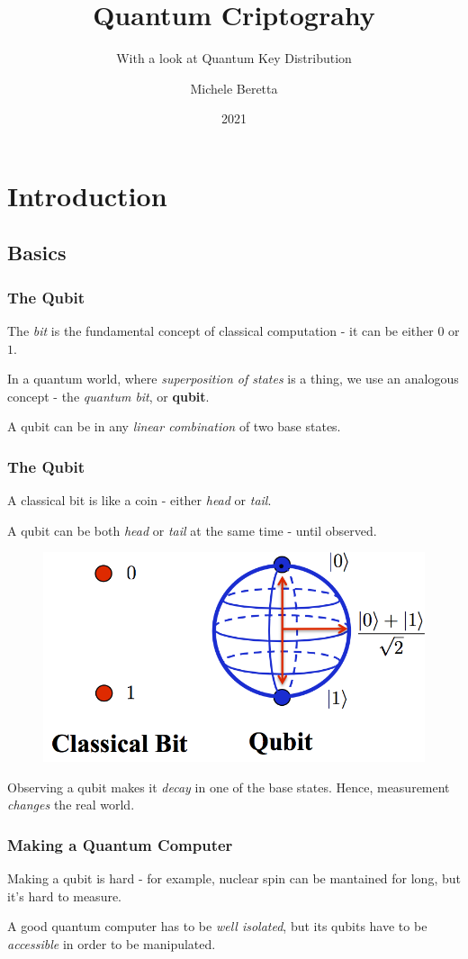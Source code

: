 \documentclass{beamer}
\title{Quantum Criptograhy}
\subtitle{With a look at Quantum Key Distribution}
\author{Michele Beretta}
\institute{UniBG
  \\ \url{https://github.com/micheleberetta98/qkd-presentation}
}
\date{2021}
\begin{document}
  \begin{frame}[plain]
    \titlepage
  \end{frame}


  \section{Introduction}
  \subsection{Basics}
  \begin{frame}
    \frametitle{The Qubit}
    The \textit{bit} is the fundamental concept of classical computation - it can be either $0$ or $1$.

    In a quantum world, where \textit{superposition of states} is a thing, we use an analogous concept -
    the \textit{quantum bit}, or \textbf{qubit}.

    A qubit can be in any \textit{linear combination} of two base states.
  \end{frame}
  \begin{frame}
    \frametitle{The Qubit}
    A classical bit is like a coin - either \textit{head} or \textit{tail}.

    A qubit can be both \textit{head} or \textit{tail} at the same time - until observed.

    \begin{figure}[H]
      \centering
      \includegraphics[width=0.5\linewidth]{qubit.png}
    \end{figure}

    Observing a qubit makes it \textit{decay} in one of the base states. Hence, measurement
    \textit{changes} the real world.
  \end{frame}
  \begin{frame}
    \frametitle{Making a Quantum Computer}
    Making a qubit is hard - for example, nuclear spin can be mantained for long, but it's hard to measure.

    A good quantum computer has to be \textit{well isolated}, but its qubits have to be \textit{accessible}
    in order to be manipulated.
  \end{frame}
  
\end{document}
